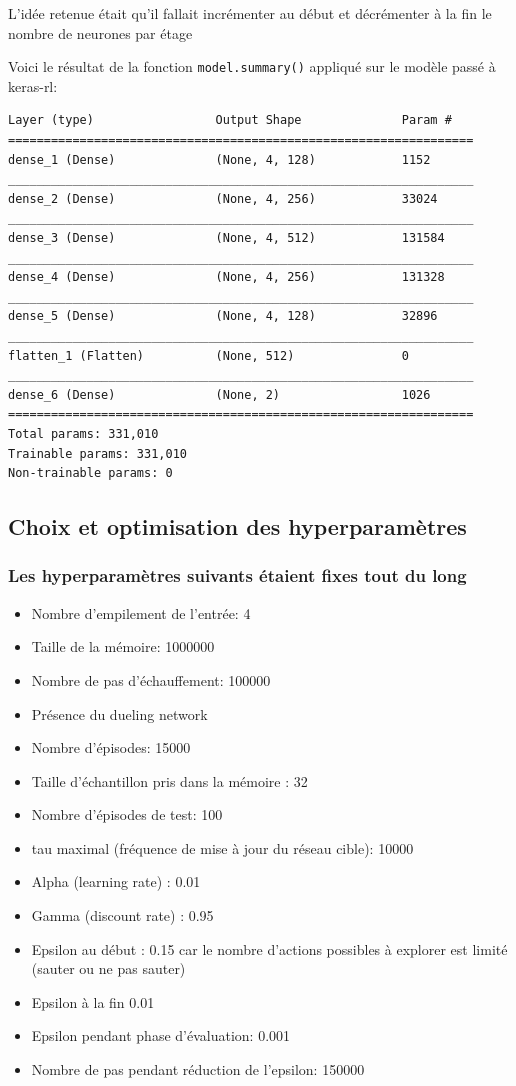 \documentclass[a4paper,10pt,openany,oneside]{report}
\begin{document}
L'idée retenue était qu'il fallait incrémenter au début et décrémenter à la fin le nombre de neurones par étage

Voici le résultat de la fonction \lstinline{model.summary()} appliqué sur le modèle passé à keras-rl:

\begin{lstlisting}
Layer (type)                 Output Shape              Param #   
=================================================================
dense_1 (Dense)              (None, 4, 128)            1152      
_________________________________________________________________
dense_2 (Dense)              (None, 4, 256)            33024     
_________________________________________________________________
dense_3 (Dense)              (None, 4, 512)            131584    
_________________________________________________________________
dense_4 (Dense)              (None, 4, 256)            131328    
_________________________________________________________________
dense_5 (Dense)              (None, 4, 128)            32896     
_________________________________________________________________
flatten_1 (Flatten)          (None, 512)               0         
_________________________________________________________________
dense_6 (Dense)              (None, 2)                 1026      
=================================================================
Total params: 331,010
Trainable params: 331,010
Non-trainable params: 0
\end{lstlisting}
\newpage
\subsection{Choix et optimisation des hyperparamètres}
\subsubsection*{Les hyperparamètres suivants étaient fixes tout du long}
\begin{itemize}
	\item Nombre d'empilement de l'entrée: 4
	\item Taille de la mémoire: 1000000
	\item Nombre de pas d'échauffement: 100000
	\item Présence du dueling network
	\item Nombre d'épisodes: 15000
	\item Taille d'échantillon pris dans la mémoire : 32
	\item Nombre d'épisodes de test: 100
	\item tau maximal (fréquence de mise à jour du réseau cible): 10000
	\item Alpha (learning rate) : 0.01
	\item Gamma (discount rate) : 0.95
	\item Epsilon au début : 0.15 car le nombre d'actions possibles à explorer est limité (sauter ou ne pas sauter)
	\item Epsilon à la fin 0.01
	\item Epsilon pendant phase d'évaluation: 0.001
	\item Nombre de pas pendant réduction de l'epsilon: 150000
\end{itemize}
\end{document}

